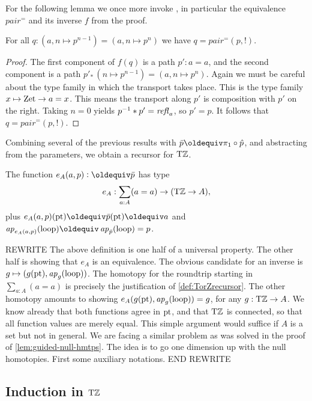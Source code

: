\documentclass[a4,12pt]{amsart}
\begin{document}
For the following lemma we once more 
invoke \cite[Theorem 2.7.2]{hottbook}, in particular
the equivalence $pair^=$ and its inverse $f$ from the proof.

\begin{lemma}\label{lem:TBN}
For all $q:(a,n\mapsto p^{n-1}) = (a,n\mapsto p^n)$ we have $q=pair^=(p,!)$.
\end{lemma}
\begin{proof}
The first component of $f(q)$ is a path $p':a=a$,
and the second component is a path 
$p'_*\, (n\mapsto p^{n-1}) = (a,n\mapsto p^n)$.
Again we must be careful about the type family in which the
transport takes place. This is the type
family $x\mapsto \mathrm{Zet}\to a=x$. 
This means the transport along $p'$ is composition with $p'$ on the right.
Taking $n=0$ yields $p^{-1}* p' = \mathop{{\it refl}_{a}}$, so $p'=p$.
It follows that $q=pair^=(p,!)$.
\end{proof}

Combining several of the previous results with 
$\bar{p}\jdeq \pi_1 \circ \hat{p}$, and abstracting from the
parameters, we obtain a recursor for ${\mathrm{T}\mathbb{Z}}$.

\begin{definition}\label{def:TorZrecursor}
The function $e_A(a,p) \defeq \bar{p}$ has type
\[
e_A : \sum_{a:A}(a=a) \to ({\mathrm{T}\mathbb{Z}} \to A),
\]
plus $e_A(a,p)(\pt) \jdeq \bar{p}(\pt) \jdeq a$ and 
$\ap{e_A(a,p)}(\Zloop)\jdeq\ap{\bar{p}}(\Zloop) = p$.
\end{definition}

REWRITE The above definition is one half of a universal property.
The other half is showing that $e_A$ is an equivalence.
The obvious candidate for an inverse is 
$g\mapsto (g({\mathord{\mathrm{pt}}}),\mathop{{\it ap}_{g}}(\mathrm{loop}))$.
The homotopy for the roundtrip starting in $\sum_{a:A}(a=a)$
is precisely the justification of \cref{def:TorZrecursor}.
The other homotopy amounts to showing
$e_A(g({\mathord{\mathrm{pt}}}),\mathop{{\it ap}_{g}}(\mathrm{loop})) = g$, for any $g:{\mathrm{T}\mathbb{Z}}\to A$.
We know already that both functions agree in ${\mathord{\mathrm{pt}}}$,
and that ${\mathrm{T}\mathbb{Z}}$ is connected, so that all function values
are merely equal. This simple argument would suffice if
$A$ is a set but not in general. We are facing a similar
problem as was solved in the proof of \cref{lem:guided-null-hmtps}.
The idea is to go one dimension up with the null homotopies.
First some auxiliary notations. END REWRITE

\subsection{Induction in ${\mathrm{T}\mathbb{Z}}$}\label{sec:TorZ-induction}
\end{document}
